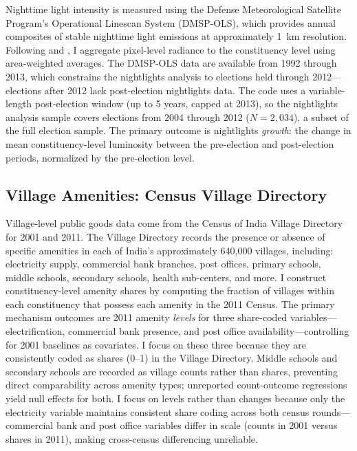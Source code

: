 \documentclass[12pt]{article}
\begin{document}
Nighttime light intensity is measured using the Defense Meteorological Satellite Program's Operational Linescan System (DMSP-OLS), which provides annual composites of stable nighttime light emissions at approximately 1~km resolution. Following \citet{henderson2012} and \citet{prakash2019}, I aggregate pixel-level radiance to the constituency level using area-weighted averages. The DMSP-OLS data are available from 1992 through 2013, which constrains the nightlights analysis to elections held through 2012---elections after 2012 lack post-election nightlights data. The code uses a variable-length post-election window (up to 5 years, capped at 2013), so the nightlights analysis sample covers elections from 2004 through 2012 ($N = 2{,}034$), a subset of the full election sample. The primary outcome is nightlights \textit{growth}: the change in mean constituency-level luminosity between the pre-election and post-election periods, normalized by the pre-election level.

\subsection{Village Amenities: Census Village Directory}

Village-level public goods data come from the Census of India Village Directory for 2001 and 2011. The Village Directory records the presence or absence of specific amenities in each of India's approximately 640,000 villages, including: electricity supply, commercial bank branches, post offices, primary schools, middle schools, secondary schools, health sub-centers, and more. I construct constituency-level amenity shares by computing the fraction of villages within each constituency that possess each amenity in the 2011 Census. The primary mechanism outcomes are 2011 amenity \textit{levels} for three share-coded variables---electrification, commercial bank presence, and post office availability---controlling for 2001 baselines as covariates. I focus on these three because they are consistently coded as shares (0--1) in the Village Directory. Middle schools and secondary schools are recorded as village counts rather than shares, preventing direct comparability across amenity types; unreported count-outcome regressions yield null effects for both. I focus on levels rather than changes because only the electricity variable maintains consistent share coding across both census rounds---commercial bank and post office variables differ in scale (counts in 2001 versus shares in 2011), making cross-census differencing unreliable.
\end{document}
